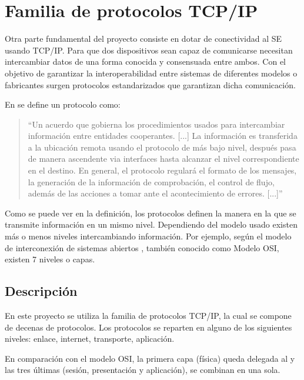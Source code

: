 \section{Familia de protocolos TCP/IP}{\label{sec:tcpip}}
Otra parte fundamental del proyecto consiste en dotar de conectividad al SE
usando TCP/IP. Para que dos dispositivos sean capaz de comunicarse necesitan
intercambiar datos de una forma conocida y consensuada entre ambos. Con el
objetivo de garantizar la interoperabilidad entre sistemas de diferentes modelos
o fabricantes surgen protocolos estandarizados que garantizan dicha
comunicación.

En  \cite{butterfield2016} se define un
protocolo como:
\begin{quotation}``Un acuerdo que gobierna los procedimientos usados
  para intercambiar información entre entidades cooperantes. [...] La
  información es transferida a la ubicación remota usando el protocolo de más
  bajo nivel, después pasa de manera ascendente via interfaces hasta alcanzar el
  nivel correspondiente en el destino. En general, el protocolo regulará el
  formato de los mensajes, la generación de la información de comprobación, el
  control de flujo, además de las acciones a tomar ante el acontecimiento de
  errores. [...]''
\end{quotation}

Como se puede ver en la definición, los protocolos definen la manera en la que
se transmite información en un mismo nivel. Dependiendo del modelo usado existen
más o menos niveles intercambiando información. Por ejemplo, según el  modelo de
interconexión de sistemas abiertos \cite{itutx200}, también conocido como Modelo
OSI, existen 7 niveles o capas.


\subsection{Descripción}{\label{sec:tcpip-desc}}
En este proyecto se utiliza la familia de protocolos TCP/IP, la cual se compone 
de decenas de protocolos. Los protocolos se reparten en alguno de los siguientes
niveles: enlace, internet, transporte, aplicación.

En comparación con el modelo OSI, la primera capa (física) queda delegada al
 y las tres últimas (sesión, presentación y aplicación),
se combinan en una sola.

